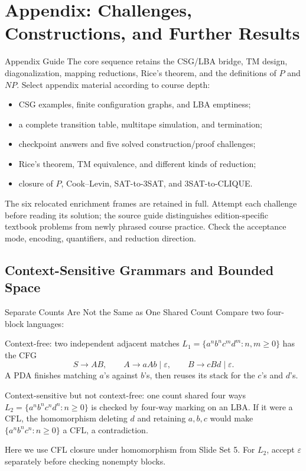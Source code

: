 \documentclass[10pt]{beamer}
\begin{document}
\appendix
\section{Appendix: Challenges, Constructions, and Further Results}

\begin{frame}{Appendix Guide}
  \small
  The core sequence retains the CSG/LBA bridge, TM design, diagonalization,
  mapping reductions, Rice's theorem, and the definitions of $P$ and $NP$.
  Select appendix material according to course depth:
  \begin{itemize}
    \item CSG examples, finite configuration graphs, and LBA emptiness;
    \item a complete transition table, multitape simulation, and termination;
    \item checkpoint answers and five solved construction/proof challenges;
    \item Rice's theorem, TM equivalence, and different kinds of reduction;
    \item closure of $P$, Cook--Levin, SAT-to-3SAT, and 3SAT-to-CLIQUE.
  \end{itemize}
  The six relocated enrichment frames are retained in full. Attempt each
  challenge before reading its solution; the source guide distinguishes
  edition-specific textbook problems from newly phrased course practice.
  Check the acceptance mode, encoding, quantifiers, and reduction direction.
\end{frame}

\subsection{Context-Sensitive Grammars and Bounded Space}

\begin{frame}{Separate Counts Are Not the Same as One Shared Count}
  \small
  Compare two four-block languages:
  \begin{block}{Context-free: two independent adjacent matches}
    $L_1=\{a^nb^nc^md^m:n,m\ge0\}$ has the CFG
    \[
      S\to AB,\qquad A\to aAb\mid\varepsilon,
      \qquad B\to cBd\mid\varepsilon.
    \]
    A PDA finishes matching $a$'s against $b$'s, then reuses its stack
    for the $c$'s and $d$'s.
  \end{block}
  \begin{block}{Context-sensitive but not context-free: one count shared four ways}
    $L_2=\{a^nb^nc^nd^n:n\ge0\}$ is checked by four-way marking on an LBA.
    If it were a CFL, the homomorphism deleting $d$ and retaining $a,b,c$
    would make $\{a^nb^nc^n:n\ge0\}$ a CFL, a contradiction.
  \end{block}
  Here we use CFL closure under homomorphism from Slide Set 5.
  For $L_2$, accept $\varepsilon$ separately before checking nonempty blocks.
\end{frame}
\end{document}
